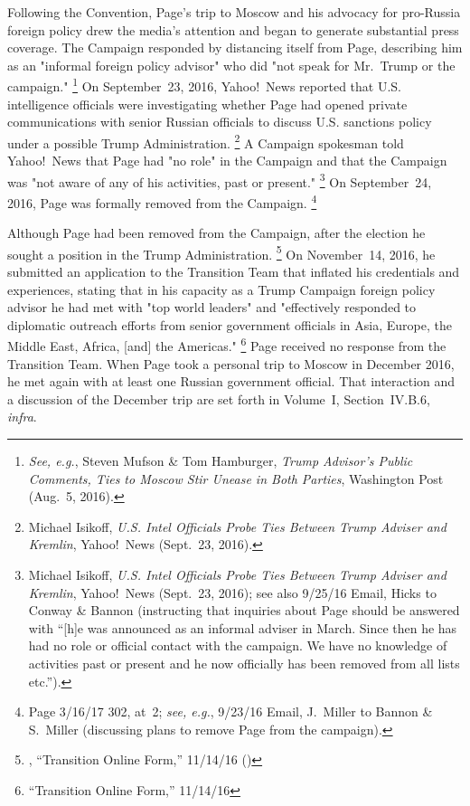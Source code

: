 Following the Convention, Page's trip to Moscow and his advocacy for pro-Russia foreign policy drew the media's attention and began to generate substantial press coverage.
The Campaign responded by distancing itself from Page, describing him as an "informal foreign policy advisor" who did "not speak for Mr.~Trump or the campaign."%
\footnote{\textit{See, e.g.}, Steven Mufson \& Tom Hamburger, \textit{Trump Advisor's Public Comments, Ties to Moscow Stir Unease in Both Parties}, Washington Post (Aug.~5, 2016).}
On September~23, 2016, Yahoo!\ News reported that U.S. intelligence officials were investigating whether Page had opened private communications with senior Russian officials to discuss U.S. sanctions policy under a possible Trump Administration.%
\footnote{Michael Isikoff, \textit{U.S. Intel Officials Probe Ties Between Trump Adviser and Kremlin}, Yahoo!\ News (Sept.~23, 2016).}
A Campaign spokesman told Yahoo!\ News that Page had "no role" in the Campaign and that the Campaign was "not aware of any of his activities, past or present."%
\footnote{Michael Isikoff, \textit{U.S. Intel Officials Probe Ties Between Trump Adviser and Kremlin}, Yahoo!\ News (Sept.~23, 2016);
see also 9/25/16 Email, Hicks to Conway \& Bannon (instructing that inquiries about Page should be answered with ``[h]e was announced as an informal adviser in March.
Since then he has had no role or official contact with the campaign.
We have no knowledge of activities past or present and he now officially has been removed from all lists etc.'').}
On September~24, 2016, Page was formally removed from the Campaign.%
\footnote{Page 3/16/17 302, at~2;
\textit{see, e.g.}, 9/23/16 Email, J.~Miller to Bannon \& S.~Miller (discussing plans to remove Page from the campaign).}

Although Page had been removed from the Campaign, after the election he sought a position in the Trump Administration.%
\footnote{, ``Transition Online Form,'' 11/14/16 ()}
On November~14, 2016, he submitted an application to the Transition Team that inflated his credentials and experiences, stating that in his capacity as a Trump Campaign foreign policy advisor he had met with "top world leaders" and "effectively responded to diplomatic outreach efforts from senior government officials in Asia, Europe, the Middle East, Africa, [and] the Americas."%
\footnote{ ``Transition Online Form,'' 11/14/16 }
Page received no response from the Transition Team.
When Page took a personal trip to Moscow in December 2016, he met again with at least one Russian government official.
That interaction and a discussion of the December trip are set forth in Volume~I, Section~IV.B.6, \textit{infra}.

